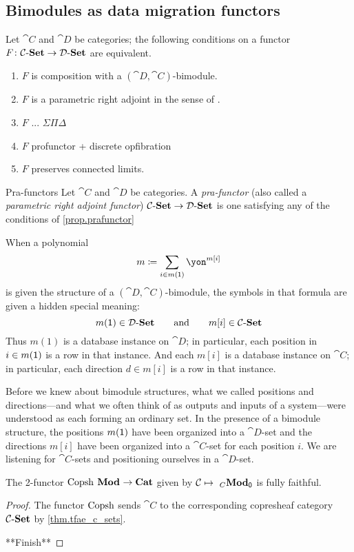 \documentclass[DynamicalBook]{subfiles}
\begin{document}
\subsection{Bimodules as data migration functors}


\begin{proposition}\label{prop.prafunctor}
Let $\cat{C}$ and $\cat{D}$ be categories; the following conditions on a functor $F\colon\mathcal{C}\textnormal{-}\textbf{Set}\to\mathcal{D}\textnormal{-}\textbf{Set}$ are equivalent.
\begin{enumerate}
	\item $F$ is composition with a $(\cat{D},\cat{C})$-bimodule.
	\item $F$ is a parametric right adjoint in the sense of \cite{}.
	\item $F$ ... $\Sigma\Pi\Delta$
	\item $F$ profunctor + discrete opfibration
	\item $F$ preserves connected limits.
\end{enumerate}
\end{proposition}

\begin{definition}{Pra-functors}
Let $\cat{C}$ and $\cat{D}$ be categories. A \emph{pra-functor} (also called a \emph{parametric right adjoint functor}) $\mathcal{C}\textnormal{-}\textbf{Set}\to\mathcal{D}\textnormal{-}\textbf{Set}$ is one satisfying any of the conditions of \cref{prop.prafunctor}
\end{definition}

When a polynomial
\[
m\coloneqq\sum_{i\in m(\1)}\yon^{m[i]}
\]
is given the structure of a $(\cat{D},\cat{C})$-bimodule, the symbols in that formula are given a hidden special meaning:
\[
  m(\textsf{1})\in\mathcal{D}\textnormal{-}\textbf{Set}
  \qquad\text{and}\qquad
	m[i]\in\mathcal{C}\textnormal{-}\textbf{Set}
\]
Thus $m(1)$ is a database instance on $\cat{D}$; in particular, each position in $i\in m(\textsf{1})$ is a row in that instance. And each $m[i]$ is a database instance on $\cat{C}$; in particular, each direction $d\in m[i]$ is a row in that instance.

Before we knew about bimodule structures, what we called positions and directions---and what we often think of as outputs and inputs of a system---were understood as each forming an ordinary set. In the presence of a bimodule structure, the positions $m(\textsf{1})$ have been organized into a $\cat{D}$-set and the directions $m[i]$ have been organized into a $\cat{C}$-set for each position $i$. We are listening for $\cat{C}$-sets and positioning ourselves in a $\cat{D}$-set.

\begin{theorem}
The 2-functor $\mathrm{Copsh}~_{}\textbf{Mod}_{}\to\textbf{Cat}$ given by $\mathcal{C}\mapsto~_{C}\textbf{Mod}_{\textsf{0}}$ is fully faithful.
\end{theorem}
\begin{proof}
The functor $\mathrm{Copsh}$ sends $\cat{C}$ to the corresponding copresheaf category $\mathcal{C}\textnormal{-}\textbf{Set}$ by \cref{thm.tfae_c_sets}.

**Finish**
\end{proof}
\end{document}
